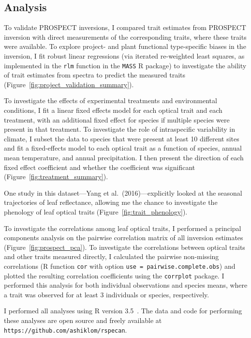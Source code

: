 \subsection{Analysis}

To validate PROSPECT inversions, I compared trait estimates from PROSPECT inversion with direct measurements of the corresponding traits, where these traits were available.
To explore project- and plant functional type-specific biases in the inversion, I fit robust linear regressions (via iterated re-weighted least squares, as implemented in the \texttt{rlm} function in the \texttt{MASS} R package) to investigate the ability of trait estimates from spectra to predict the measured traits (Figure~\ref{fig:project_validation_summary}).

To investigate the effects of experimental treatments and environmental conditions, I fit a linear fixed effects model for each optical trait and each treatment, with an additional fixed effect for species if multiple species were present in that treatment.
To investigate the role of intraspecific variability in climate, I subset the data to species that were present at least 10 different sites and fit a fixed-effects model to each optical trait as a function of species, annual mean temperature, and annual precipitation.
I then present the direction of each fixed effect coefficient and whether the coefficient was significant (Figure~\ref{fig:treatment_summary}).

One study in this dataset---Yang et al.~(2016)\nocite{yang_2016_seasonal}---explicitly looked at the seasonal trajectories of leaf reflectance, allowing me the chance to investigate the phenology of leaf optical traits (Figure~\ref{fig:trait_phenology}).

To investigate the correlations among leaf optical traits, I performed a principal components analysis on the pairwise correlation matrix of all inversion estimates (Figure~\ref{fig:prospect_pca}).
To investigate the correlations between optical traits and other traits measured directly, I calculated the pairwise non-missing correlations (R function \texttt{cor} with option \texttt{use = pairwise.complete.obs}) and plotted the resulting correlation coefficients using the \texttt{corrplot} package.
I performed this analysis for both individual observations and species means, where a trait was observed for at least 3 individuals or species, respectively.

I performed all analyses using R version 3.5~\cite{rstats}.
The data and code for performing these analyses are open source and freely available at \texttt{https://github.com/ashiklom/rspecan}.
